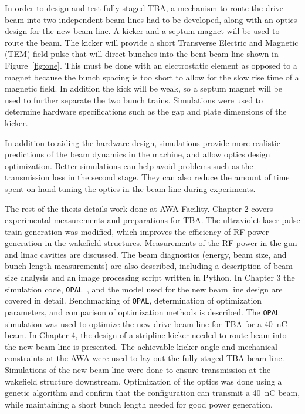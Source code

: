  \label{sec:requirements}

In order to design and test fully staged TBA, a mechanism to route the drive beam into two independent beam lines had to be developed, along with an optics design for the new beam line. A kicker and a septum magnet will be used to route the beam. 
The kicker will provide a short Transverse Electric and Magnetic (TEM) field pulse
that will direct bunches into the bent beam line shown in Figure~\ref{fig:one}. 
This must be done with an electrostatic element as opposed to a magnet because 
the bunch spacing is too short to allow for the slow rise time of a magnetic field.
In addition the kick will be weak, so a septum magnet will be used to further
separate the two bunch trains. Simulations were used to determine hardware specifications such as the gap and plate dimensions of the kicker.

In addition to aiding the hardware design, simulations provide more realistic predictions of the beam dynamics in the machine, and allow optics design optimization.
Better simulations can help avoid problems such as the transmission loss in the second stage.
They can also reduce the amount of time spent on hand tuning the optics in the 
beam line during experiments.






The rest of the thesis details work done at AWA Facility.
Chapter 2 covers experimental measurements and preparations for TBA.
The ultraviolet laser pulse train generation was modified, 
which improves the efficiency of RF power generation in the wakefield structures.
Measurements of the RF power in the gun and linac cavities are discussed.  
The beam diagnostics (energy, beam size, and bunch length measurements) are also described, including a description of beam size analysis and an image processing script written in Python. 
In Chapter 3 the simulation code, \verb|OPAL|~\cite{opal}, and the model used for the new beam line design are covered in detail.
Benchmarking of \verb|OPAL|, determination of optimization parameters, and comparison of optimization methods is described.  
The \verb|OPAL| simulation was used to optimize the new drive beam line for TBA for a \SI{40}{nC} beam. 
In Chapter 4, the design of a stripline kicker needed to route beam into the new beam line is presented.
The achievable kicker angle and mechanical constraints at the AWA 
were used to lay out the fully staged TBA beam line. 
Simulations of the new beam line were done to ensure transmission at
the wakefield structure downstream. Optimization of the optics was done using 
a genetic algorithm and confirm that the configuration can transmit a \SI{40}{nC} beam, 
while maintaining a short bunch length needed for good power generation.



